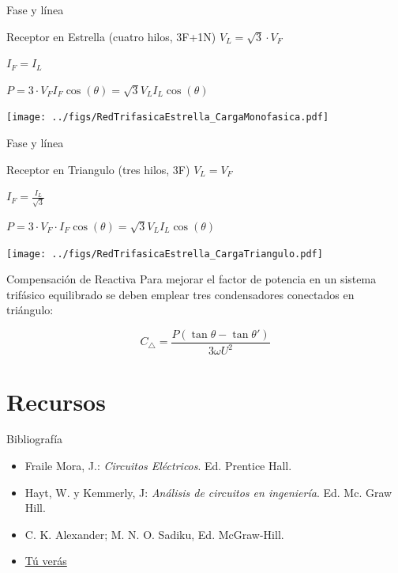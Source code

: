 \documentclass[xcolor={usenames,svgnames,dvipsnames}]{beamer}
\begin{document}
\begin{frame}[label={sec:orgfab3d17}]{Fase y línea}
\begin{block}{Receptor en Estrella (cuatro hilos, 3F+1N)}
\(V_{L}=\sqrt{3}\cdot V_{F}\) 

\(I_{F}=I_{L}\)

\(P=3\cdot V_{F}I_{F}\cos(\theta)=\sqrt{3}V_{L}I_{L}\cos(\theta)\)
\begin{center}
\texttt{[image: ../figs/RedTrifasicaEstrella\_CargaMonofasica.pdf]}
\end{center}
\end{block}
\end{frame}

\begin{frame}[label={sec:orgdee2228}]{Fase y línea}
\begin{block}{Receptor en Triangulo (tres hilos, 3F)}
\(V_{L}=V_{F}\) 

\(I_{F}=\frac{I_{L}}{\sqrt{3}}\)

\(P=3\cdot V_{F}\cdot I_{F}\cos(\theta)=\sqrt{3}V_{L}I_{L}\cos(\theta)\)
\begin{center}
\texttt{[image: ../figs/RedTrifasicaEstrella\_CargaTriangulo.pdf]}
\end{center}
\end{block}
\end{frame}

\begin{frame}[label={sec:org7eeea4b}]{Compensación de Reactiva}
Para mejorar el factor de potencia en un sistema trifásico equilibrado se deben emplear \alert{tres condensadores conectados en triángulo}:

\[
  C_\triangle = \frac{P(\tan \theta - \tan \theta')}{3\omega U^2}
\]
\end{frame}

\section{Recursos}
\label{sec:orgd051dd8}

\begin{frame}[label={sec:org40ec3bd}]{Bibliografía}
\begin{itemize}
\item \alert{Fraile Mora, J.}: \emph{Circuitos Eléctricos}. Ed. Prentice Hall.

\item \alert{Hayt, W. y Kemmerly, J}: \emph{Análisis de circuitos en ingeniería}. Ed.
Mc. Graw Hill.

\item \alert{C. K. Alexander; M. N. O. Sadiku}, Ed. McGraw-Hill.

\item \href{http://tuveras.com/index.html}{Tú verás}
\end{itemize}
\end{frame}
\end{document}
